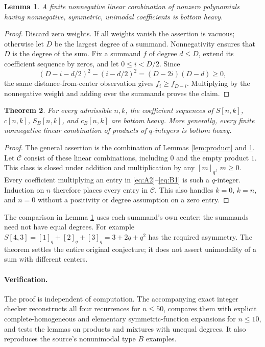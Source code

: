 \documentclass[11pt]{article}
\newtheorem{theorem}{Theorem}
\newtheorem{lemma}[theorem]{Lemma}
\newcommand{\qi}[1]{[#1]_q}
\begin{document}
\begin{lemma}\label{lem:sum}
A finite nonnegative linear combination of nonzero polynomials
having nonnegative, symmetric, unimodal coefficients is bottom heavy.
\end{lemma}
\begin{proof}
Discard zero weights. If all weights vanish the assertion is vacuous;
otherwise let \(D\) be the largest degree of a summand. Nonnegativity
ensures that \(D\) is the degree of the sum.
Fix a summand \(f\) of degree \(d\le D\), extend its coefficient
sequence by zeros, and let \(0\le i<D/2\). Since
\[
 (D-i-d/2)^2-(i-d/2)^2=(D-2i)(D-d)\ge0,
\]
the same distance-from-center observation gives \(f_i\ge f_{D-i}\).
Multiplying by the nonnegative weight and adding over the summands
proves the claim.
\end{proof}

\begin{theorem}\label{thm:main}
For every admissible \(n,k\), the coefficient sequences of
\(S[n,k]\), \(c[n,k]\), \(S_B[n,k]\), and \(c_B[n,k]\) are bottom heavy.
More generally, every finite nonnegative linear combination of
products of \(q\)-integers is bottom heavy.
\end{theorem}
\begin{proof}
The general assertion is the combination of Lemmas
\ref{lem:product} and \ref{lem:sum}. Let \(\mathcal C\) consist of
these linear combinations, including \(0\) and the empty product \(1\).
This class is closed under addition and multiplication by any
\(\qi{m}\), \(m\ge0\). Every coefficient multiplying an entry in
\eqref{eq:A2}--\eqref{eq:B1} is such a \(q\)-integer.
Induction on \(n\) therefore places every entry in \(\mathcal C\).
This also handles \(k=0\), \(k=n\), and \(n=0\) without a positivity
or degree assumption on a zero entry.
\end{proof}

The comparison in Lemma \ref{lem:sum} uses each summand's own center:
the summands need not have equal degrees. For example
\(S[4,3]=\qi1+\qi2+\qi3=3+2q+q^2\) has the required asymmetry.
The theorem settles the entire original conjecture; it does not
assert unimodality of a sum with different centers.

\paragraph{Verification.}
The proof is independent of computation. The accompanying exact
integer checker reconstructs all four recurrences for \(n\le50\),
compares them with explicit complete-homogeneous and elementary
symmetric-function expansions for \(n\le10\), and tests the lemmas
on products and mixtures with unequal degrees. It also reproduces
the source's nonunimodal type \(B\) examples.
\end{document}
